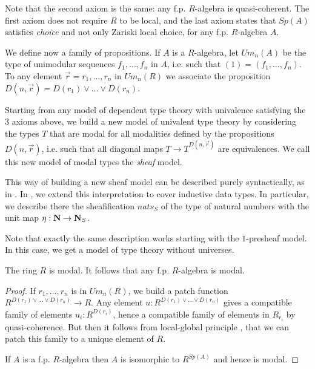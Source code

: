 Note that the second axiom is the same: any f.p. $R$-algebra is quasi-coherent. The first axiom does not require
$R$ to be local, and the last axiom states that $Sp(A)$ satisfies \emph{choice} and not only Zariski local choice,
for any f.p. $R$-algebra $A$.

We define now a family of propositions. If $A$ is a $R$-algebra, let $Um_n(A)$ be the type of unimodular sequences
\cite{lombardi-quitte}
$f_1,\dots,f_n$ in $A$, i.e. such that $(1) = (f_1,\dots,f_n)$. To any element $\vec{r} = r_1,\dots,r_n$
in $Um_n(R)$ we associate
the proposition $D(n,\vec{r}) = D(r_1)\vee\dots\vee D(r_n)$.%

  Starting from any model of dependent type theory with univalence satisfying the 3 axioms above, we build a new
  model of univalent type theory by considering the types $T$ that are modal for all modalities defined by the propositions
  $D(n,\vec{r})$, i.e. such that all diagonal maps $T\rightarrow T^{D(n,\vec{r})}$ are equivalences.
    We call this new model of modal types the \emph{sheaf} model.

    This way of building a new sheaf model can be described purely syntactically, as in \cite{Quirin16}. In \cite{CRS21}, we extend
    this interpretation to cover inductive data types. In particular, we describe there the sheafification $nats_S$ of the type
    of natural numbers with the unit map $\eta:\mathbf{N}\rightarrow\mathbf{N}_S$. 

    Note that exactly the same description works starting with the $1$-presheaf model. In this case, we get a model
    of type theory without universes.

    \begin{proposition}\label{modal}
      The ring $R$ is modal. It follows that any f.p. $R$-algebra is modal.
    \end{proposition}

    \begin{proof}
      If $r_1,\dots,r_n$ is in $Um_n(R)$, we build a patch function $R^{D(r_1)\vee\dots\vee D(r_n)}\rightarrow R$.
      Any element $u:R^{D(r_1)\vee\dots\vee D(r_n)}$ gives a compatible family of elements $u_i:R^{D(r_i)}$, hence
      a compatible family of elements in $R_{r_i}$ by quasi-coherence. But then it follows from local-global
      principle \cite{lombardi-quitte}, that we can patch this family to a unique element of $R$.
      
      If $A$ is a f.p. $R$-algebra then $A$ is isomorphic to $R^{Sp(A)}$ and hence is modal.
    \end{proof}

